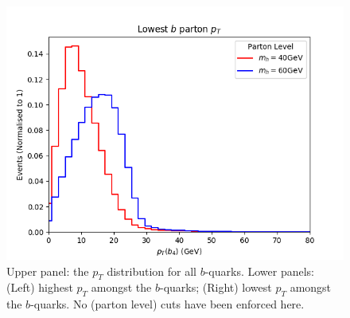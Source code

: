 \documentclass[12pt]{article}
\begin{document}
\begin{figure}[htb!]
\begin{center}
	\includegraphics[scale=0.42]{plots/parton/b4_pt.png}
	 \end{center}
	\caption{Upper panel: the $p_T$ distribution for all $b$-quarks. Lower panels: (Left) highest $p_T$ amongst the $b$-quarks; (Right) lowest $p_T$
amongst the $b$-quarks. No (parton level) cuts have been enforced here.}
\label{fig:parton_b}
\end{figure}


\end{document}
